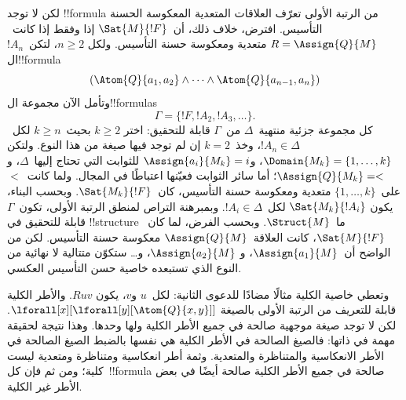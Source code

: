 \documentclass[../../../include/open-logic-section]{subfiles}
\begin{document}
لكن لا توجد !!{formula} من الرتبة الأولى تعرّف العلاقات المتعدية
المعكوسة الحسنة التأسيس. افترض، خلاف ذلك، أن~$\Sat{M}{!F}$ إذا وفقط
إذا كانت~$R = \Assign{Q}{M}$ متعدية ومعكوسة حسنة التأسيس. ولكل
$n \ge 2$، لتكن~$!A_n$ ال!!{formula}
\[
(\Atom{Q}{a_1,a_2} \land \dots \land
    \Atom{Q}{a_{n-1},a_{n}})
\]
وتأمل الآن مجموعة ال!!{formula}s
\[
\Gamma = \{!F, !A_2, !A_3, \dots\}.
\]
كل مجموعة جزئية منتهية~$\Delta$ من~$\Gamma$ قابلة للتحقيق: اختر
$k \ge 2$ بحيث~$k \ge n$ لكل~$!A_n \in \Delta$، وخذ~$k=2$ إن لم
توجد فيها صيغة من هذا النوع. ولتكن
$\Domain{M_k} = \{1, \dots, k\}$، و$\Assign{a_i}{M_k} = i$
للثوابت التي تحتاج إليها~$\Delta$، و$\Assign{Q}{M_k} = <$؛ أما سائر
الثوابت فعيّنها اعتباطًا في المجال. ولما كانت~$<$ على~$\{1, \dots, k\}$
متعدية ومعكوسة حسنة التأسيس، كان~$\Sat{M_k}{!F}$. وبحسب البناء، يكون
$\Sat{M_k}{!A_i}$ لكل~$!A_i \in \Delta$. وبمبرهنة التراص لمنطق الرتبة
الأولى، تكون~$\Gamma$ قابلة للتحقيق في !!{structure} ما~$\Struct{M}$.
وبحسب الفرض، لما كان~$\Sat{M}{!F}$، كانت العلاقة~$\Assign{Q}{M}$
معكوسة حسنة التأسيس. لكن من الواضح أن~$\Assign{a_1}{M}$، و
$\Assign{a_2}{M}$، و\dots{} ستكوّن متتالية لا نهائية من النوع الذي
تستبعده خاصية حسن التأسيس العكسي.

وتعطي خاصية الكلية مثالًا مضادًا للدعوى الثانية: لكل~$u$ و$v$، يكون
$Ruv$. والأطر الكلية قابلة للتعريف من الرتبة الأولى بالصيغة
$\lforall[x][\lforall[y][\Atom{Q}{x,y}]]$. لكن لا توجد صيغة موجهية
صالحة في جميع الأطر الكلية ولها وحدها. وهذا نتيجة لحقيقة مهمة في
ذاتها: فالصيغ الصالحة في الأطر الكلية هي نفسها بالضبط
الصيغ الصالحة في الأطر الانعكاسية والمتناظرة والمتعدية. وثمة
أطر انعكاسية ومتناظرة ومتعدية ليست كلية؛ ومن ثم فإن كل~!!{formula}
صالحة في جميع الأطر الكلية صالحة أيضًا في بعض الأطر غير الكلية.
\end{document}

